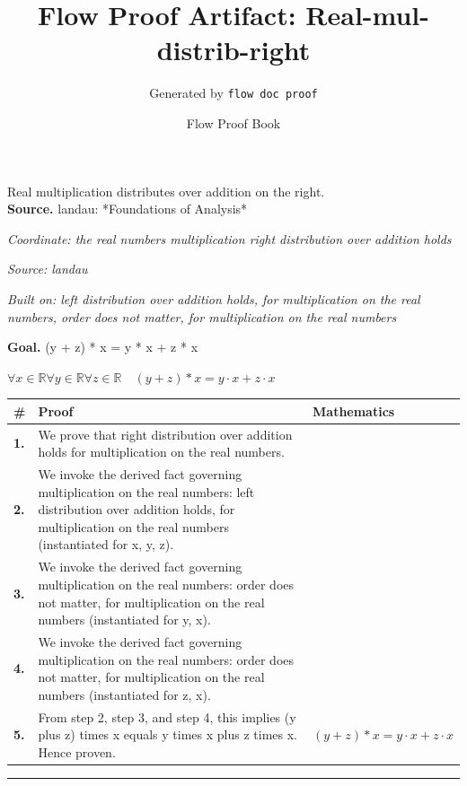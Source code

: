 \documentclass[11pt]{article}
\title{Flow Proof Artifact: Real-mul-distrib-right}
\author{Generated by \texttt{flow doc proof}}
\date{Flow Proof Book}
\theoremstyle{definition}
\begin{document}
\maketitle
Real multiplication distributes over addition on the right.\\[0.5em]
\textbf{Source.} landau: *Foundations of Analysis*\\[0.5em]
\bigskip
{}\par
\smallskip\noindent\textit{Coordinate: the real numbers \cdot multiplication \cdot right distribution over addition holds}\par
\smallskip\noindent\textit{Source: landau}\par
\smallskip\noindent\textit{Built on: left distribution over addition holds, for multiplication on the real numbers, order does not matter, for multiplication on the real numbers}\par
\medskip
\noindent\textbf{Goal.} (y + z) * x = y * x + z * x\par
\noindent$\displaystyle \forall x \in \mathbb{R} \forall y \in \mathbb{R} \forall z \in \mathbb{R}\quad (y + z) * x = y \cdot x + z \cdot x$\par
\medskip
\noindent
\begin{tabular}{@{} >{\raggedright\arraybackslash}p{} >{\raggedright\arraybackslash}p{} >{\raggedleft\arraybackslash}p{} @{}}
\textbf{\#} & \textbf{Proof} & \textbf{Mathematics} \\
\midrule
\textbf{1.} & We prove that right distribution over addition holds for multiplication on the real numbers. & \\[0.45em]
\textbf{2.} & We invoke the derived fact governing multiplication on the real numbers: left distribution over addition holds, for multiplication on the real numbers (instantiated for x, y, z). & \\[0.45em]
\textbf{3.} & We invoke the derived fact governing multiplication on the real numbers: order does not matter, for multiplication on the real numbers (instantiated for y, x). & \\[0.45em]
\textbf{4.} & We invoke the derived fact governing multiplication on the real numbers: order does not matter, for multiplication on the real numbers (instantiated for z, x). & \\[0.45em]
\textbf{5.} & From step 2, step 3, and step 4, this implies (y plus z) times x equals y times x plus z times x. Hence proven. & $\displaystyle (y + z) * x = y \cdot x + z \cdot x$ \\[0.45em]
\bottomrule
\end{tabular}
\label{thm:Real-multiplication-right_distribution_over_addition_holds}
\par\medskip\hrule
\end{document}
